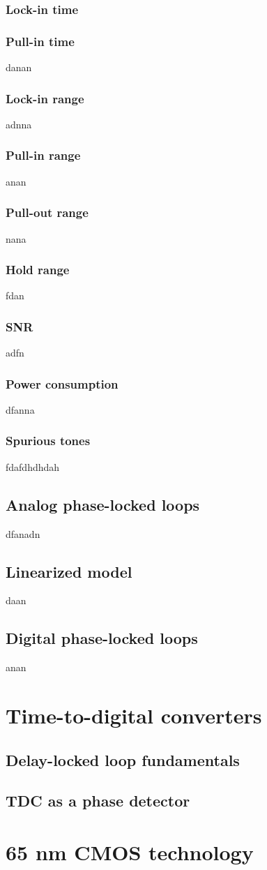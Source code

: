 \subsubsection{Lock-in time}

\subsubsection{Pull-in time}
danan
\subsubsection{Lock-in range}
adnna
\subsubsection{Pull-in range}
anan
\subsubsection{Pull-out range}
nana
\subsubsection{Hold range}
fdan
\subsubsection{SNR}
adfn
\subsubsection{Power consumption}
dfanna
\subsubsection{Spurious tones}
fdafdhdhdah

\subsection{Analog phase-locked loops}
dfanadn
\subsection{Linearized model}
daan
\subsection{Digital phase-locked loops}
anan
\section{Time-to-digital converters}
\subsection{Delay-locked loop fundamentals}
\subsection{TDC as a phase detector}

\section{65 nm CMOS technology}
